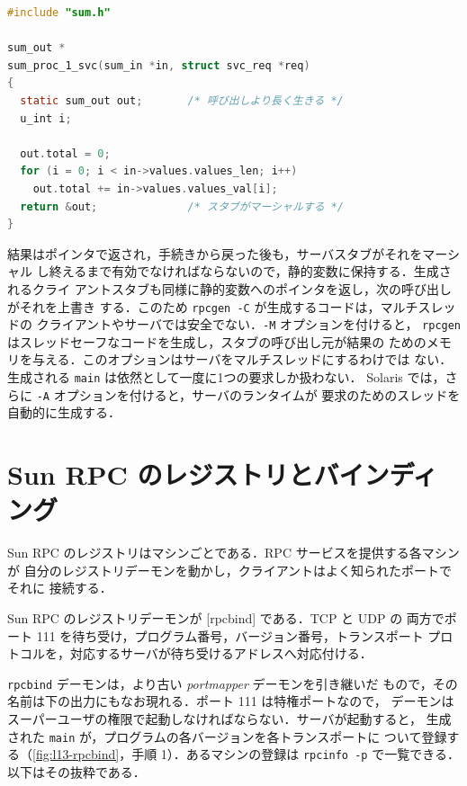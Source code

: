 \documentclass[../main.tex]{subfiles}
\begin{document}
\begin{lstlisting}[language=C, numbers=none]
#include "sum.h"

sum_out *
sum_proc_1_svc(sum_in *in, struct svc_req *req)
{
  static sum_out out;       /* 呼び出しより長く生きる */
  u_int i;

  out.total = 0;
  for (i = 0; i < in->values.values_len; i++)
    out.total += in->values.values_val[i];
  return &out;              /* スタブがマーシャルする */
}
\end{lstlisting}

結果はポインタで返され，手続きから戻った後も，サーバスタブがそれをマーシャル
し終えるまで有効でなければならないので，静的変数に保持する．生成されるクライ
アントスタブも同様に静的変数へのポインタを返し，次の呼び出しがそれを上書き
する．このため \texttt{rpcgen -C} が生成するコードは，マルチスレッドの
クライアントやサーバでは安全でない．\texttt{-M} オプションを付けると，
\texttt{rpcgen} はスレッドセーフなコードを生成し，スタブの呼び出し元が結果の
ためのメモリを与える．このオプションはサーバをマルチスレッドにするわけでは
ない．生成される \texttt{main} は依然として一度に1つの要求しか扱わない．
Solaris では，さらに \texttt{-A} オプションを付けると，サーバのランタイムが
要求のためのスレッドを自動的に生成する．

\section{Sun RPC のレジストリとバインディング}
\label{sec:l13-sun-binding}

Sun RPC のレジストリはマシンごとである．RPC サービスを提供する各マシンが
自分のレジストリデーモンを動かし，クライアントはよく知られたポートでそれに
接続する．

\begin{definition}[rpcbind]
  Sun RPC のレジストリデーモンが [rpcbind] である．TCP と UDP の
  両方でポート 111 を待ち受け，プログラム番号，バージョン番号，トランスポート
  プロトコルを，対応するサーバが待ち受けるアドレスへ対応付ける．
\end{definition}

\texttt{rpcbind} デーモンは，より古い \emph{portmapper} デーモンを引き継いだ
もので，その名前は下の出力にもなお現れる．ポート 111 は特権ポートなので，
デーモンはスーパーユーザの権限で起動しなければならない．サーバが起動すると，
生成された \texttt{main} が，プログラムの各バージョンを各トランスポートに
ついて登録する（\cref{fig:l13-rpcbind}，手順 1）．あるマシンの登録は
\texttt{rpcinfo -p} で一覧できる．以下はその抜粋である．%
\end{document}
